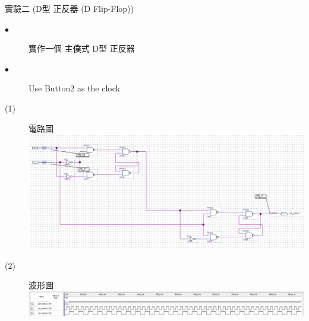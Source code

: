 \documentclass[12pt, a4paper]{article}
\begin{document}
\begin{description}
\begin{description}
          \fontsize{20pt}{22pt}\selectfont
          \item 實驗二 (D型 正反器 (D Flip-Flop))
          \fontsize{16pt}{18pt}\selectfont
            \begin{description}
              \item [$\bullet$] 實作一個 主僕式 D型 正反器
              \item [$\bullet$] Use Button2 as the clock \\
              \fontsize{18pt}{20pt}
                \item [(1)]電路圖 \\[.3cm]
                  \includegraphics[width=13cm]{./image/ex2.PNG}
                \item [(2)] 波形圖 \\[.3cm]
                  \includegraphics[width=13cm]{./image/EX2_2.PNG} \\             
            \end{description}
          \normalsize



\end{description}
\end{description}
\end{document}

